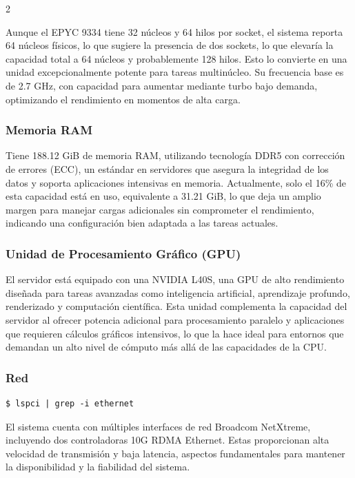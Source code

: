 \begin{multicols*}{2}

Aunque el EPYC 9334 tiene 32 núcleos y 64 hilos por socket, el sistema reporta 64 núcleos físicos, lo que sugiere la presencia de dos sockets, lo que elevaría la capacidad total a 64 núcleos y probablemente 128 hilos. Esto lo convierte en una unidad excepcionalmente potente para tareas multinúcleo. Su frecuencia base es de 2.7 GHz, con capacidad para aumentar mediante turbo bajo demanda, optimizando el rendimiento en momentos de alta carga.

\subsubsection*{Memoria RAM}
Tiene 188.12 GiB de memoria RAM, utilizando tecnología DDR5 con corrección de errores (ECC), un estándar en servidores que asegura la integridad de los datos y soporta aplicaciones intensivas en memoria. Actualmente, solo el 16\% de esta capacidad está en uso, equivalente a 31.21 GiB, lo que deja un amplio margen para manejar cargas adicionales sin comprometer el rendimiento, indicando una configuración bien adaptada a las tareas actuales.


\subsubsection*{Unidad de Procesamiento Gráfico (GPU)}
El servidor está equipado con una NVIDIA L40S, una GPU de alto rendimiento diseñada para tareas avanzadas como inteligencia artificial, aprendizaje profundo, renderizado y computación científica. Esta unidad complementa la capacidad del servidor al ofrecer potencia adicional para procesamiento paralelo y aplicaciones que requieren cálculos gráficos intensivos, lo que la hace ideal para entornos que demandan un alto nivel de cómputo más allá de las capacidades de la CPU.

\subsubsection*{Red}
\begin{verbatim}
$ lspci | grep -i ethernet
\end{verbatim}

El sistema cuenta con múltiples interfaces de red Broadcom NetXtreme, incluyendo dos controladoras 10G RDMA Ethernet. Estas proporcionan alta velocidad de transmisión y baja latencia, aspectos fundamentales para mantener la disponibilidad y la fiabilidad del sistema.


\end{multicols*}
